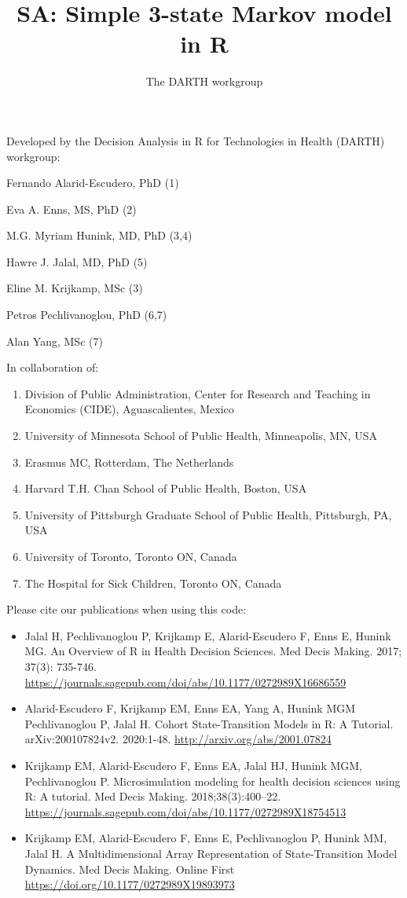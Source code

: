 \documentclass[
]{article}
\title{SA: Simple 3-state Markov model in R}
\author{The DARTH workgroup}
\date{}
\providecommand{\tightlist}{%
  \setlength{\itemsep}{0pt}\setlength{\parskip}{0pt}}
\begin{document}
\maketitle

Developed by the Decision Analysis in R for Technologies in Health
(DARTH) workgroup:

Fernando Alarid-Escudero, PhD (1)

Eva A. Enns, MS, PhD (2)

M.G. Myriam Hunink, MD, PhD (3,4)

Hawre J. Jalal, MD, PhD (5)

Eline M. Krijkamp, MSc (3)

Petros Pechlivanoglou, PhD (6,7)

Alan Yang, MSc (7)

In collaboration of:

\begin{enumerate}
\def\labelenumi{\arabic{enumi}.}
\tightlist
\item
  Division of Public Administration, Center for Research and Teaching in
  Economics (CIDE), Aguascalientes, Mexico
\item
  University of Minnesota School of Public Health, Minneapolis, MN, USA
\item
  Erasmus MC, Rotterdam, The Netherlands
\item
  Harvard T.H. Chan School of Public Health, Boston, USA
\item
  University of Pittsburgh Graduate School of Public Health, Pittsburgh,
  PA, USA
\item
  University of Toronto, Toronto ON, Canada
\item
  The Hospital for Sick Children, Toronto ON, Canada
\end{enumerate}

Please cite our publications when using this code:

\begin{itemize}
\item
  Jalal H, Pechlivanoglou P, Krijkamp E, Alarid-Escudero F, Enns E,
  Hunink MG. An Overview of R in Health Decision Sciences. Med Decis
  Making. 2017; 37(3): 735-746.
  \url{https://journals.sagepub.com/doi/abs/10.1177/0272989X16686559}
\item
  Alarid-Escudero F, Krijkamp EM, Enns EA, Yang A, Hunink MGM
  Pechlivanoglou P, Jalal H. Cohort State-Transition Models in R: A
  Tutorial. arXiv:200107824v2. 2020:1-48.
  \url{http://arxiv.org/abs/2001.07824}
\item
  Krijkamp EM, Alarid-Escudero F, Enns EA, Jalal HJ, Hunink MGM,
  Pechlivanoglou P. Microsimulation modeling for health decision
  sciences using R: A tutorial. Med Decis Making. 2018;38(3):400--22.
  \url{https://journals.sagepub.com/doi/abs/10.1177/0272989X18754513}
\item
  Krijkamp EM, Alarid-Escudero F, Enns E, Pechlivanoglou P, Hunink MM,
  Jalal H. A Multidimensional Array Representation of State-Transition
  Model Dynamics. Med Decis Making. Online First
  \url{https://doi.org/10.1177/0272989X19893973}
\end{itemize}
\end{document}
